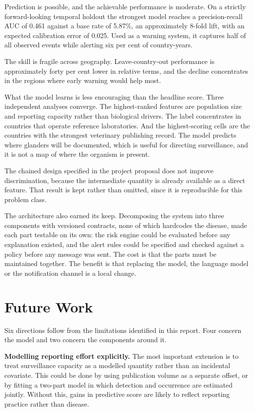 \documentclass[10pt,openany]{report}
\begin{document}
Prediction is possible, and the achievable performance is moderate. On a strictly forward-looking temporal holdout the strongest model reaches a
precision-recall AUC of 0.461 against a base rate of 5.87\%, an approximately 8-fold
lift, with an expected calibration error of 0.025. Used as a warning system, it captures half of
all observed events while alerting six per cent of country-years.

The skill is fragile across geography. Leave-country-out performance is approximately forty per
cent lower in relative terms, and the decline concentrates in the regions where early warning would
help most.

What the model learns is less encouraging than the headline score. Three independent analyses
converge. The highest-ranked features are population size and reporting capacity rather than
biological drivers. The label concentrates in countries that operate
reference laboratories. And the highest-scoring cells are the countries with the strongest
veterinary publishing record. The model predicts where glanders will be documented, which is
useful for directing surveillance, and it is not a map of where the organism is present.

The chained design specified in the project proposal does not improve discrimination, because the
intermediate quantity is already available as a direct feature. That result is kept rather than
omitted, since it is reproducible for this problem class.

The architecture also earned its keep. Decomposing the system into three components with versioned
contracts, none of which hardcodes the disease, made each part testable on its own: the risk engine
could be evaluated before any explanation existed, and the alert rules could be specified and
checked against a policy before any message was sent. The cost is that the parts must be maintained
together. The benefit is that replacing the model, the language model or the notification channel
is a local change.

\section{Future Work}

Six directions follow from the limitations identified in this report. Four concern the model and
two concern the components around it.

\textbf{Modelling reporting effort explicitly.} The most important extension is to treat
surveillance capacity as a modelled quantity rather than an incidental covariate. This could be
done by using publication volume as a separate offset, or by fitting a two-part model in which
detection and occurrence are estimated jointly. Without this, gains in predictive score are
likely to reflect reporting practice rather than disease.
\end{document}
